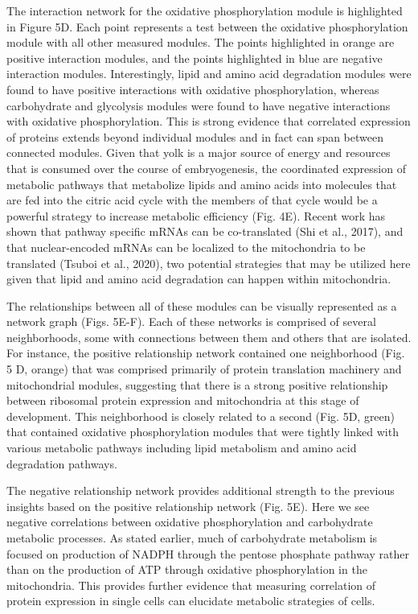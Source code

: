 The interaction network for the oxidative phosphorylation module is highlighted in Figure 5D. Each point represents a test between the oxidative phosphorylation module with all other measured modules. The points highlighted in orange are positive interaction modules, and the points highlighted in blue are negative interaction modules. Interestingly, lipid and amino acid degradation modules were found to have positive interactions with oxidative phosphorylation, whereas carbohydrate and glycolysis modules were found to have negative interactions with oxidative phosphorylation. This is strong evidence that correlated expression of proteins extends beyond individual modules and in fact can span between connected modules. Given that yolk is a major source of energy and resources that is consumed over the course of embryogenesis, the coordinated expression of metabolic pathways that metabolize lipids and amino acids into molecules that are fed into the citric acid cycle with the members of that cycle would be a powerful strategy to increase metabolic efficiency (Fig. 4E). Recent work has shown that pathway specific mRNAs can be co-translated (Shi et al., 2017), and that nuclear-encoded mRNAs can be localized to the mitochondria to be translated (Tsuboi et al., 2020), two potential strategies that may be utilized here given that lipid and amino acid degradation can happen within mitochondria.

The relationships between all of these modules can be visually represented as a network graph (Figs. 5E-F). Each of these networks is comprised of several neighborhoods, some with connections between them and others that are isolated. For instance, the positive relationship network contained one neighborhood (Fig. 5 D, orange) that was comprised primarily of protein translation machinery and mitochondrial modules, suggesting that there is a strong positive relationship between ribosomal protein expression and mitochondria at this stage of development. This neighborhood is closely related to a second (Fig. 5D, green) that contained oxidative phosphorylation modules that were tightly linked with various metabolic pathways including lipid metabolism and amino acid degradation pathways.  

The negative relationship network provides additional strength to the previous insights based on the positive relationship network (Fig. 5E). Here we see negative correlations between oxidative phosphorylation and carbohydrate metabolic processes. As stated earlier, much of carbohydrate metabolism is focused on production of NADPH through the pentose phosphate pathway rather than on the production of ATP through oxidative phosphorylation in the mitochondria. This provides further evidence that measuring correlation of protein expression in single cells can elucidate metabolic strategies of cells.
